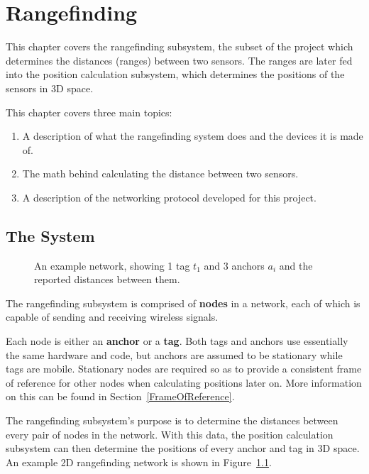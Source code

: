 
\chapter{Rangefinding} %

\label{Rangefinding}


This chapter covers the rangefinding subsystem, the subset of the project which determines the distances (ranges) between two sensors. The ranges are later fed into the position calculation subsystem, which determines the positions of the sensors in 3D space.

This chapter covers three main topics:
\begin{enumerate}
	\item A description of what the rangefinding system does and the devices it is made of.
	\item The math behind calculating the distance between two sensors.
	\item A description of the networking protocol developed for this project.
\end{enumerate}

\section{The System}
\begin{figure}
	\centering
	
	\decoRule
	\caption{An example network, showing 1 tag $t_1$ and 3 anchors $a_i$ and the reported distances between them.}
	\label{fig:ExampleNetwork}
\end{figure}

The rangefinding subsystem is comprised of \textbf{nodes} in a network, each of which is capable of sending and receiving wireless signals.

Each node is either an \textbf{anchor} or a \textbf{tag}. Both tags and anchors use essentially the same hardware and code, but anchors are assumed to be stationary while tags are mobile. Stationary nodes are required so as to provide a consistent frame of reference for other nodes when calculating positions later on. More information on this can be found in Section~\ref{FrameOfReference}.

The rangefinding subsystem's purpose is to determine the distances between every pair of nodes in the network. With this data, the position calculation subsystem can then determine the positions of every anchor and tag in 3D space. An example 2D rangefinding network is shown in Figure~\ref{fig:ExampleNetwork}.

